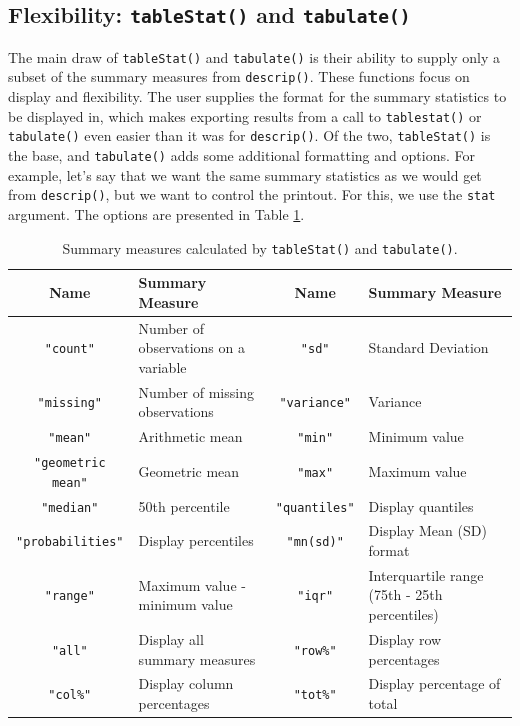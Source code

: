 \documentclass[landscape]{article}
\begin{document}
\subsection{Flexibility: \texttt{tableStat()} and \texttt{tabulate()}}
The main draw of \texttt{tableStat()} and \texttt{tabulate()} is their ability to supply only a subset of the summary measures from \texttt{descrip()}. These functions focus on display and flexibility. The user supplies the format for the summary statistics to be displayed in, which makes exporting results from a call to \texttt{tablestat()} or \texttt{tabulate()} even easier than it was for \texttt{descrip()}. Of the two, \texttt{tableStat()} is the base, and \texttt{tabulate()} adds some additional formatting and options. For example, let's say that we want the same summary statistics as we would get from \texttt{descrip()}, but we want to control the printout. For this, we use the \texttt{stat} argument. The options are presented in Table \ref{stattable}.
\begin{table}[ht]
\begin{tabular}{cl|cl}
Name & Summary Measure & Name & Summary Measure\\
\hline
\texttt{"count"} & Number of observations on a variable & \texttt{"sd"} & Standard Deviation\\
\texttt{"missing"} & Number of missing observations & \texttt{"variance"} & Variance\\
\texttt{"mean"} & Arithmetic mean & \texttt{"min"} & Minimum value\\
\texttt{"geometric mean"} & Geometric mean & \texttt{"max"} & Maximum value\\
\texttt{"median"} & 50th percentile & \texttt{"quantiles"} & Display quantiles\\
\texttt{"probabilities"} & Display percentiles & \texttt{"mn(sd)"} & Display Mean (SD) format\\
\texttt{"range"} & Maximum value - minimum value & \texttt{"iqr"} & Interquartile range (75th - 25th percentiles)\\
\texttt{"all"} & Display all summary measures & \texttt{"row\%"} & Display row percentages\\
\texttt{"col\%"} & Display column percentages & \texttt{"tot\%"} & Display percentage of total\\
\end{tabular}
\caption{Summary measures calculated by \texttt{tableStat()} and \texttt{tabulate()}.}
\label{stattable}
\end{table}
\end{document}
